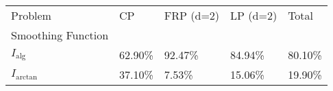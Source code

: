 \begin{tabular}{lllll}
Problem & CP & FRP (d=2) & LP (d=2) & Total \\
Smoothing Function &  &  &  &  \\
$I_\text{alg}$ & 62.90\% & 92.47\% & 84.94\% & 80.10\% \\
\cline{1-5}
$I_\text{arctan}$ & 37.10\% & 7.53\% & 15.06\% & 19.90\% \\
\cline{1-5}
\end{tabular}
